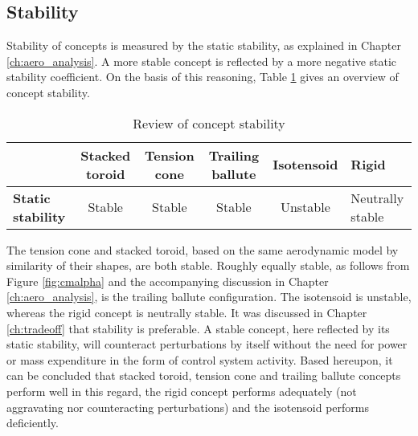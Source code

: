 \subsection{Stability}
Stability of concepts is measured by the static stability, as explained in Chapter \ref{ch:aero_analysis}. A more stable concept is reflected by a more negative static stability coefficient. On the basis of this reasoning, Table \ref{tab:stab} gives an overview of concept stability.

\begin{table}[h]
\caption{Review of concept stability}
\hspace{-10mm}
\begin{tabular}{|p{2.5cm}|c|c|c|c|p{2cm}|}
\hline
\textbf{}                          & \textbf{Stacked toroid} & \textbf{Tension cone} & \textbf{Trailing ballute} & \textbf{Isotensoid} & \textbf{Rigid} \\ \hline
\textbf{Static stability} &\cellcolor{green!70} Stable  &\cellcolor{green!70}  Stable   &\cellcolor{green!70} Stable & \cellcolor{red!60}   Unstable          &\cellcolor{yellow!75} Neutrally stable                 \\ \hline
\end{tabular}
\label{tab:stab}
\end{table}

The tension cone and stacked toroid, based on the same aerodynamic model by similarity of their shapes, are both stable. Roughly equally stable, as follows from Figure \ref{fig:cmalpha} and the accompanying discussion in Chapter \ref{ch:aero_analysis}, is the trailing ballute configuration. The isotensoid is unstable, whereas the rigid concept is neutrally stable. It was discussed in Chapter \ref{ch:tradeoff} that stability is preferable. A stable concept, here reflected by its static stability, will counteract perturbations by itself without the need for power or mass expenditure in the form of control system activity. Based hereupon, it can be concluded that stacked toroid, tension cone and trailing ballute concepts perform well in this regard, the rigid concept performs adequately (not aggravating nor counteracting perturbations) and the isotensoid performs deficiently. 

